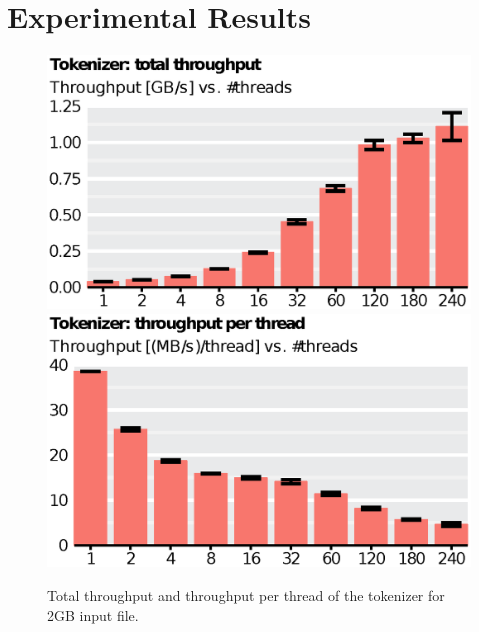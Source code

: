 
\section{Experimental Results}\label{sec:exp}

\begin{figure}
    \includegraphics[scale=.45]{img/def/tokenizer_tp_total.eps}
    \includegraphics[scale=.45]{img/def/tokenizer_tp_per_thread.eps}
    \caption{Total throughput and throughput per thread of the tokenizer
    for 2GB input file.}
    \label{fig:tokenizertp}
\end{figure}

